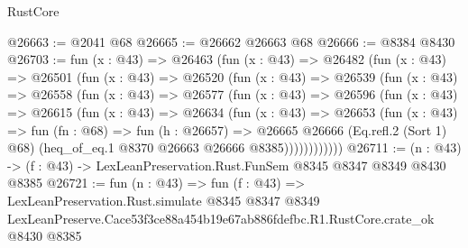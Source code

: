 \begin{lexlean}{RustCore}
\begin{coremodule}
@26663 := @2041 @68
@26665 := @26662 @26663 @68
@26666 := @8384 @8430
@26703 := fun (x : @43) =>
  @26463
    (fun (x : @43) =>
    @26482
      (fun (x : @43) =>
      @26501
        (fun (x : @43) =>
        @26520
          (fun (x : @43) =>
          @26539
            (fun (x : @43) =>
            @26558
              (fun (x : @43) =>
              @26577
                (fun (x : @43) =>
                @26596
                  (fun (x : @43) =>
                  @26615
                    (fun (x : @43) =>
                    @26634
                      (fun (x : @43) =>
                      @26653
                        (fun (x : @43) =>
                        fun (fn : @68) =>
                        fun (h : @26657) =>
                        @26665
                          @26666
                          (Eq.refl.{2} (Sort 1) @68)
                          (heq_of_eq.{1} @8370 @26663 @26666 @8385))))))))))))
@26711 := (n : @43) -> (f : @43) -> LexLeanPreservation.Rust.FunSem @8345 @8347 @8349 @8430 @8385
@26721 := fun (n : @43) =>
  fun (f : @43) =>
  LexLeanPreservation.Rust.simulate
    @8345
    @8347
    @8349
    LexLeanPreserve.Cace53f3ce88a454b19e67ab886fdefbc.R1.RustCore.crate_ok
    @8430
    @8385
\end{coremodule}
\end{lexlean}
